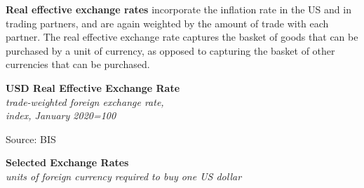\documentclass{report}
\makeatletter
\newcommand{\tbllink}[1]{\href{https://raw.githubusercontent.com/bdecon/US-chartbook/master/chartbook/data/#1}{\faTable}}
\newcommand*\short[1]{\expandafter\@gobbletwo\number\numexpr#1\relax}
\newcommand{\shdateaxisticks}{
		date coordinates in=x, axis line style={draw=none},
		xmax={2023-11-01},
		max space between ticks=40,	    
		xtick={{1990-01-01}, {1995-01-01}, {2000-01-01}, 
			{2005-01-01}, {2010-01-01}, {2015-01-01}, {2020-01-01}},
		minor xtick={},
		enlarge y limits={0.06}, enlarge x limits={0.01},
		}
\newcommand{\bbar}[2]{extra #1 ticks = {{#2}}, extra #1 tick labels = ,
		extra #1 tick style = {grid=major, grid style={thick, black!25}},}
\newcommand{\stdline}[4]{\addplot[very thick, no markers, color=#1] 
		table [x=#2, y=#3, col sep=comma] {#4};	}
\newcommand{\rebars}{
		\fill[color=black!10] (axis cs:{2007-12-01},\pgfkeysvalueof{/pgfplots/ymin}) rectangle 
			(axis cs:{2009-07-01}, \pgfkeysvalueof{/pgfplots/ymax});
		\fill[color=black!10] (axis cs:{2001-03-01},\pgfkeysvalueof{/pgfplots/ymin}) rectangle 
			(axis cs:{2001-11-01}, \pgfkeysvalueof{/pgfplots/ymax});
		\fill[color=black!10] (axis cs:{2020-02-01},\pgfkeysvalueof{/pgfplots/ymin}) rectangle 
			(axis cs:{2020-05-01}, \pgfkeysvalueof{/pgfplots/ymax});}
\makeatother
\begin{document}
{\begin{minipage}{0.76\textwidth}
\textbf{Real effective exchange rates} incorporate the inflation rate in the US and in trading partners, and are again weighted by the amount of trade with each partner. The real effective exchange rate captures the basket of goods that can be purchased by a unit of currency, as opposed to capturing the basket of other currencies that can be purchased. 
\vspace*{-1.5mm}

\begin{minipage}{0.61\textwidth}
\normalsize \textbf{USD Real Effective Exchange Rate}\\
\footnotesize{\textit{trade-weighted foreign exchange rate,}}\\
\footnotesize{\textit{index, January 2020=100}}
\vspace{2.3cm}

\hspace{3mm} 

\footnotesize{Source: BIS} \hfill \tbllink{reer.csv} \ \ 
\end{minipage}\hfill
\begin{minipage}{0.33\textwidth}
\small 
\end{minipage}
\vspace{5mm}

\normalsize \textbf{Selected Exchange Rates}\\
\footnotesize{\textit{units of foreign currency required to buy one US dollar}}\\
\rowcolors{1}{}{black!5} \setlength{\tabcolsep}{1.0pt} \color{black!90}
	{\renewcommand{\arraystretch}{1.52}
		\begin{tabular}{p{12mm} R{14.5mm} R{14.5mm} R{14.5mm} R{14.5mm} R{14.0mm} 
		 				 R{14.0mm} R{14.0mm}}
			  \hline
		\end{tabular}}\vspace{-2mm}
		

\end{minipage}}
\end{document}
